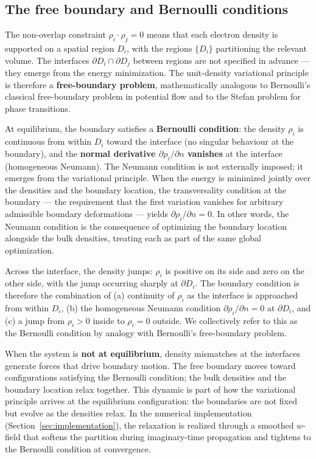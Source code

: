 \documentclass[11pt]{article}
\begin{document}
\subsection{The free boundary and Bernoulli conditions}\label{sec:bernoulli}

The non-overlap constraint $\rho_i \cdot \rho_j = 0$ means that each electron density is supported on a spatial region $D_i$, with the regions $\{D_i\}$ partitioning the relevant volume. The interfaces $\partial D_i \cap \partial D_j$ between regions are not specified in advance --- they emerge from the energy minimization. The unit-density variational principle is therefore a \textbf{free-boundary problem}, mathematically analogous to Bernoulli's classical free-boundary problem in potential flow and to the Stefan problem for phase transitions.

At equilibrium, the boundary satisfies a \textbf{Bernoulli condition}: the density $\rho_i$ is continuous from within $D_i$ toward the interface (no singular behaviour at the boundary), and the \textbf{normal derivative $\partial \rho_i / \partial n$ vanishes} at the interface (homogeneous Neumann). The Neumann condition is not externally imposed; it emerges from the variational principle. When the energy is minimized jointly over the densities and the boundary location, the transversality condition at the boundary --- the requirement that the first variation vanishes for arbitrary admissible boundary deformations --- yields $\partial \rho_i / \partial n = 0$. In other words, the Neumann condition is the consequence of optimizing the boundary location alongside the bulk densities, treating each as part of the same global optimization.

Across the interface, the density jumps: $\rho_i$ is positive on its side and zero on the other side, with the jump occurring sharply at $\partial D_i$. The boundary condition is therefore the combination of (a) continuity of $\rho_i$ as the interface is approached from within $D_i$, (b) the homogeneous Neumann condition $\partial \rho_i / \partial n = 0$ at $\partial D_i$, and (c) a jump from $\rho_i > 0$ inside to $\rho_i = 0$ outside. We collectively refer to this as the Bernoulli condition by analogy with Bernoulli's free-boundary problem.

When the system is \textbf{not at equilibrium}, density mismatches at the interfaces generate forces that drive boundary motion. The free boundary moves toward configurations satisfying the Bernoulli condition; the bulk densities and the boundary location relax together. This dynamic is part of how the variational principle arrives at the equilibrium configuration: the boundaries are not fixed but evolve as the densities relax. In the numerical implementation (Section~\ref{sec:implementation}), the relaxation is realized through a smoothed $w$-field that softens the partition during imaginary-time propagation and tightens to the Bernoulli condition at convergence.
\end{document}
